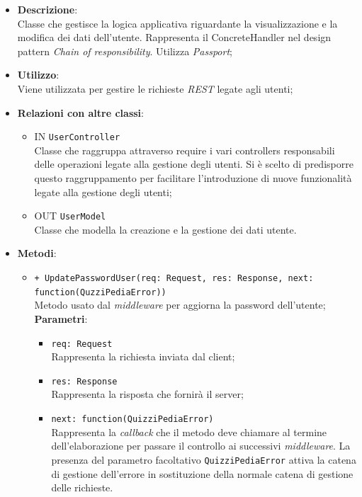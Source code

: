 \begin{itemize}
	\item 
	\textbf{Descrizione}:\\
	Classe che gestisce la logica applicativa riguardante la visualizzazione e la modifica dei dati dell'utente.
Rappresenta il ConcreteHandler nel design pattern \textit{Chain of responsibility}. Utilizza \textit{Passport};
	\item
	\textbf{Utilizzo}:\\
	Viene utilizzata per gestire le richieste \textit{REST} legate agli utenti;
	\item
	\textbf{Relazioni con altre classi}:
	\begin{itemize}
		\item
		IN \texttt{UserController} \\
		Classe che raggruppa attraverso require i vari controllers responsabili delle operazioni legate alla gestione degli utenti. Si è scelto di predisporre questo raggruppamento per facilitare l'introduzione di nuove funzionalità legate alla gestione degli utenti;
		\item
		OUT \texttt{UserModel} \\
		Classe che modella la creazione e la gestione dei dati utente.
	\end{itemize}
	\item
	\textbf{Metodi}:
	\begin{itemize}
		\item
		\texttt{+ UpdatePasswordUser(req: Request, res: Response, next: function(QuzziPediaError))} \\
		Metodo usato dal \textit{middleware} per aggiorna la password dell'utente; \\
		\textbf{Parametri}:
		 \begin{itemize}
		  \item
			\texttt{req: Request} \\
			Rappresenta la richiesta inviata dal client;
		  \item
			\texttt{res: Response} \\
			Rappresenta la risposta che fornirà il server;
		  \item
		    \texttt{next: function(QuizziPediaError)} \\
			Rappresenta la \textit{callback} che il metodo deve chiamare al termine dell'elaborazione per passare il controllo ai successivi \textit{middleware}. La presenza del parametro facoltativo \texttt{QuizziPediaError} attiva la catena di gestione dell'errore in sostituzione della normale catena di gestione delle richieste.

\end{itemize}
\end{itemize}
\end{itemize}
